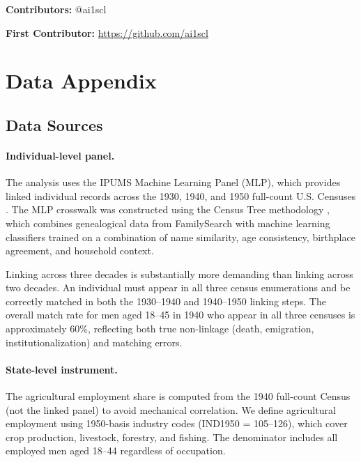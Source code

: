 \documentclass[12pt]{article}
\begin{document}
\noindent\textbf{Contributors:} @ai1scl

\noindent\textbf{First Contributor:} \url{https://github.com/ai1scl}

\label{apep_main_text_end}
\newpage


\newpage
\appendix

\section{Data Appendix}
\label{app:data}

\subsection{Data Sources}

\paragraph{Individual-level panel.} The analysis uses the IPUMS Machine Learning Panel (MLP), which provides linked individual records across the 1930, 1940, and 1950 full-count U.S. Censuses \citep{ruggles2024}. The MLP crosswalk was constructed using the Census Tree methodology \citep{price2019}, which combines genealogical data from FamilySearch with machine learning classifiers trained on a combination of name similarity, age consistency, birthplace agreement, and household context.

Linking across three decades is substantially more demanding than linking across two decades. An individual must appear in all three census enumerations and be correctly matched in both the 1930--1940 and 1940--1950 linking steps. The overall match rate for men aged 18--45 in 1940 who appear in all three censuses is approximately 60\%, reflecting both true non-linkage (death, emigration, institutionalization) and matching errors.

\paragraph{State-level instrument.} The agricultural employment share is computed from the 1940 full-count Census (not the linked panel) to avoid mechanical correlation. We define agricultural employment using 1950-basis industry codes (IND1950 = 105--126), which cover crop production, livestock, forestry, and fishing. The denominator includes all employed men aged 18--44 regardless of occupation.
\end{document}
